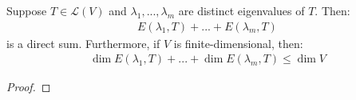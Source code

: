 \documentclass{article}
\begin{document}
\begin{theorem}
  \label{thm:sum-of-eigenspaces is a direct sum}
  Suppose $T \in \mathcal{L}(V)$ and $\lambda_1, ..., \lambda_m$ are
  distinct eigenvalues of $T$. Then:
  \begin{align*}
    E(\lambda_1, T) + ... + E(\lambda_m, T)
  \end{align*}
  is a direct sum. Furthermore, if $V$ is finite-dimensional, then:
  \begin{align*}
    \dim E(\lambda_1, T) + ... + \dim E(\lambda_m, T) \le \dim V
  \end{align*}
\end{theorem}
\begin{proof}

\end{proof}
\end{document}
